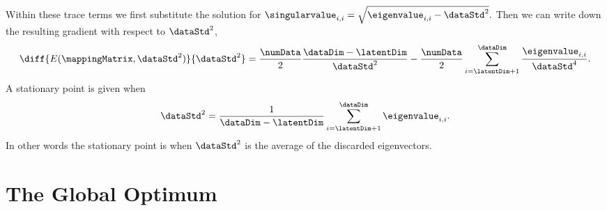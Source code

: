 Within these trace terms we first substitute the solution for
$\singularvalue_{i, i} = \sqrt{\eigenvalue_{i, i} -\dataStd^2}. $ Then
we can write down the resulting gradient with respect to $\dataStd^2$,
\[
\diff{E(\mappingMatrix, \dataStd^2)}{\dataStd^2} = \frac{\numData}{2}\frac{\dataDim - \latentDim}{\dataStd^2}-\frac{\numData}{2}\sum_{i=\latentDim+1}^\dataDim \frac{\eigenvalue_{i, i}}{\dataStd^4}. 
\]
A stationary point is given when 
\[
\dataStd^2 =\frac{1}{\dataDim - \latentDim} \sum_{i=\latentDim+1}^\dataDim \eigenvalue_{i, i}.
\]
In other words the stationary point is when $\dataStd^2$ is the
average of the discarded eigenvectors.

\section{The Global Optimum}

